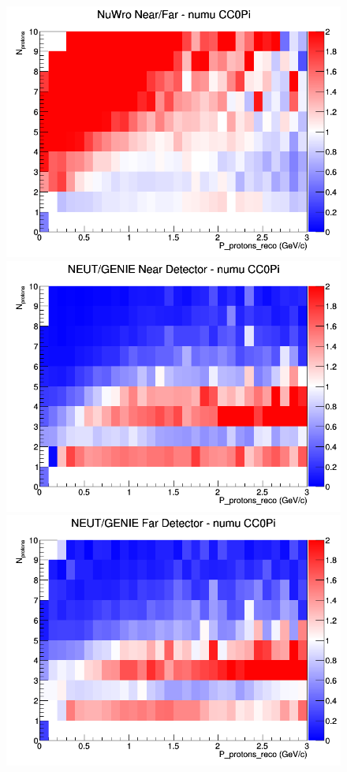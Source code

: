 \begin{figure}[h]
\endminipage
{}
\includegraphics[width=\linewidth]{eff_N_P/GAr/protons/ratios/CC0Pi_NuWro_numu_NF_N_P.png}
\endminipage
\newline
{}
\includegraphics[width=\linewidth]{eff_N_P/GAr/protons/ratios/CC0Pi_NEUT_GENIE_numu_near_N_P.png}
\endminipage
{}
\includegraphics[width=\linewidth]{eff_N_P/GAr/protons/ratios/CC0Pi_NEUT_GENIE_numu_far_N_P.png}

\end{figure}
